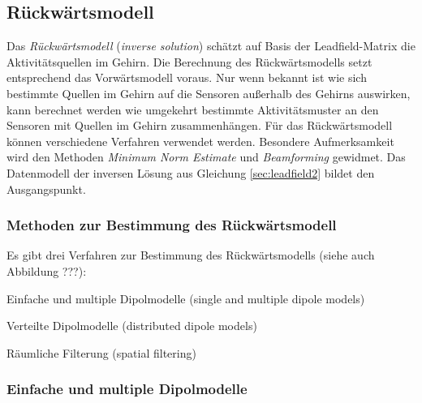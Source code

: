 \documentclass[doc,a4paper,12pt]{apa6}
\begin{document}


\subsection{Rückwärtsmodell}

Das \emph{Rückwärtsmodell} (\emph{inverse solution}) schätzt auf Basis der Leadfield-Matrix die Aktivitätsquellen im Gehirn. Die Berechnung des Rückwärtsmodells setzt entsprechend das Vorwärtsmodell voraus. Nur wenn bekannt ist wie sich bestimmte Quellen im Gehirn auf die Sensoren außerhalb des Gehirns auswirken, kann berechnet werden wie umgekehrt bestimmte Aktivitätsmuster an den Sensoren mit Quellen im Gehirn zusammenhängen. Für das Rückwärtsmodell können verschiedene Verfahren verwendet werden. Besondere Aufmerksamkeit wird den Methoden \emph{Minimum Norm Estimate} und \emph{Beamforming} gewidmet. Das Datenmodell der inversen Lösung aus Gleichung \ref{sec:leadfield2} bildet den Ausgangspunkt.

\subsubsection{Methoden zur Bestimmung des Rückwärtsmodell}

Es gibt drei Verfahren zur Bestimmung des Rückwärtsmodells (siehe auch Abbildung ???):

\begin{compactitem}
\item Einfache und multiple Dipolmodelle (single and multiple dipole models)
\item Verteilte Dipolmodelle (distributed dipole models)
\item Räumliche Filterung (spatial filtering)
\end{compactitem}

\subsubsection{Einfache und multiple Dipolmodelle}
\end{document}
